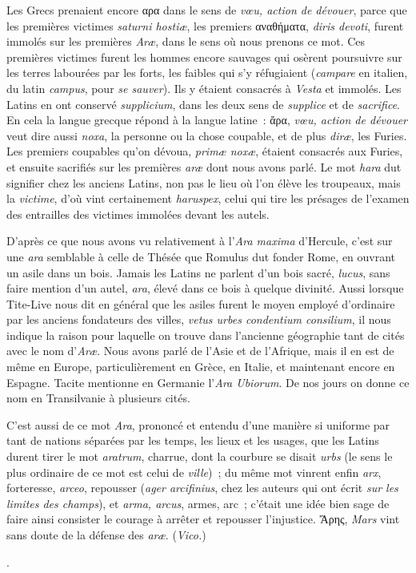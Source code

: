 \documentclass[french,twoside]{book} %
\newcommand\chapterclose{} %
\begin{document}
{Les Grecs prenaient encore αρα dans le sens de {\itshape vœu, action de dévouer}, parce que les premières victimes {\itshape saturni hostiæ}, les premiers αναθήματα, {\itshape diris devoti}, furent immolés sur les premières {\itshape Aræ}, dans le sens où nous prenons ce mot. Ces premières victimes furent les hommes encore sauvages qui osèrent poursuivre sur les terres labourées par les forts, les faibles qui s’y réfugiaient ({\itshape campare} en italien, du latin {\itshape campus}, pour {\itshape se sauver}). Ils y étaient consacrés à {\itshape Vesta} et immolés. Les Latins en ont conservé {\itshape supplicium}, dans les deux sens de {\itshape supplice} et de {\itshape sacrifice}. En cela la langue grecque répond à la langue latine : ἄρα, {\itshape vœu, action de dévouer} veut dire aussi {\itshape noxa}, la personne ou la chose coupable, et de plus {\itshape diræ}, les Furies. Les premiers coupables qu’on dévoua, {\itshape primæ noxæ}, étaient consacrés aux Furies, et ensuite sacrifiés sur les premières {\itshape aræ} dont nous avons parlé. Le mot {\itshape hara} dut signifier chez les anciens Latins, non pas le lieu où l’on élève les troupeaux, mais la {\itshape victime}, d’où vint certainement {\itshape haruspex}, celui qui tire les présages de l’examen des entrailles des victimes immolées devant les autels.\par
D’après ce que nous avons vu relativement à l’{\itshape Ara maxima} d’Hercule, c’est sur une {\itshape ara} semblable à celle de Thésée que Romulus dut fonder Rome, en ouvrant un asile dans un bois. Jamais les Latins ne parlent d’un bois sacré, {\itshape lucus}, sans faire mention d’un autel, {\itshape ara}, élevé dans ce bois à quelque divinité. Aussi lorsque Tite-Live nous dit en général que les asiles furent le moyen employé d’ordinaire par les anciens fondateurs des villes, \emph{{\itshape vetus urbes condentium consilium}}, il nous indique la raison pour laquelle on trouve dans l’ancienne géographie tant de cités avec le nom d’{\itshape Aræ}. Nous avons parlé de l’Asie et de l’Afrique, mais il en est de même en Europe, particulièrement en Grèce, en Italie, et maintenant encore en Espagne. Tacite mentionne en Germanie l’{\itshape Ara Ubiorum}. De nos jours on donne ce nom en Transilvanie à plusieurs cités.\par
C’est aussi de ce mot {\itshape Ara}, prononcé et entendu d’une manière si uniforme par tant de nations séparées par les temps, les lieux et les usages, que les Latins durent tirer le mot {\itshape aratrum}, charrue, dont la courbure se disait {\itshape urbs} (le sens le plus ordinaire de ce mot est celui de {\itshape ville}) ; du même mot vinrent enfin {\itshape arx}, forteresse, {\itshape arceo}, repousser ({\itshape ager arcifinius}, chez les auteurs qui ont écrit {\itshape sur les limites des champs}), et {\itshape arma, arcus}, armes, arc ; c’était une idée bien sage de faire ainsi consister le courage à arrêter et repousser l’injustice. Ἄρης, {\itshape Mars} vint sans doute de la défense des {\itshape aræ}. ({\itshape Vico.})
}.
\chapterclose
\end{document}
